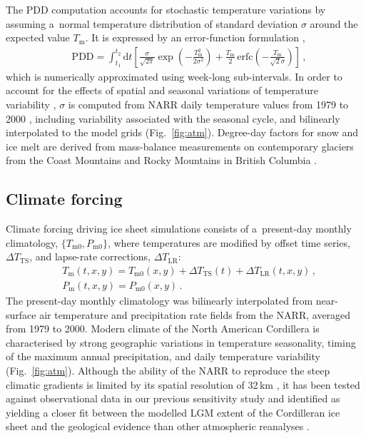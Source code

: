 \documentclass{article}
\newcommand{\unit}[1]{\ensuremath{\mathrm{#1}}}
\begin{document}
      The PDD computation accounts for stochastic temperature variations by
      assuming a~normal temperature distribution of standard deviation
      $\sigma$ around the expected value $T_{\mathrm{m}}$. It is expressed
      by an error-function formulation \citep{Calov.Greve.2005},
\begin{align}
&\label{eqn:calovgreve}
    {\text{PDD}} = \int_{t_1}^{t_2} \mathrm{d}t
        \left[\frac{\sigma}{\sqrt{2\pi}}
                \exp\left({-\frac{T_{\mathrm{m}}^2}{2\sigma^2}}\right)
              + \frac{T_{\mathrm{m}}}{2} \, {\text{erfc}}
                \left(-\frac{T_{\mathrm{m}}}{\sqrt{2}\sigma}\right)\right] \,,
\end{align}
      which is numerically approximated using week-long sub-intervals. In
      order to account for the effects of spatial and seasonal variations of
      temperature variability \citep{Seguinot.2013}, $\sigma$ is computed
      from NARR daily temperature values from 1979 to 2000
      \citep{Mesinger.etal.2006}, including variability associated with the
      seasonal cycle, and bilinearly interpolated to the model grids
      (Fig.~\ref{fig:atm}). Degree-day factors for snow and
      ice melt are derived from mass-balance measurements on contemporary
      glaciers from the Coast Mountains and Rocky Mountains in British
      Columbia \citep[Table~\ref{tab:params};][]{Shea.etal.2009}.

\subsection{Climate forcing}
\label{sec:atm}%

      Climate forcing driving ice sheet simulations consists of
      a~present-day monthly climatology, $\{T_{\mathrm{m}0},
      P_{\mathrm{m}0}\}$, where temperatures are modified by offset time
      series, ${\Delta}T_{\text{TS}}$, and lapse-rate corrections,
      ${\Delta}T_{\text{LR}}$:
\begin{align}
&T_{\mathrm{m}}(t, x, y) = T_{\mathrm{m}0}(x, y) + {\Delta}T_{\text{TS}}(t)
                    + {\Delta}T_{\text{LR}}(t, x, y) \,, \\
&    P_{\mathrm{m}}(t, x, y) = P_{\mathrm{m}0}(x, y) \,.
\end{align}
      The present-day monthly climatology was bilinearly interpolated from
      near-surface air
      temperature and precipitation rate fields from the NARR, averaged from
      1979 to 2000. Modern climate of the North American Cordillera is
      characterised by strong geographic variations in temperature
      seasonality, timing of the maximum annual precipitation, and daily
      temperature variability (Fig.~\ref{fig:atm}). Although the ability
      of the NARR to reproduce the steep climatic gradients is limited by its
      spatial resolution of 32\,\unit{km} \citep{Jarosch.etal.2012}, it has
      been tested against observational data in our previous sensitivity
      study and identified as yielding a closer fit between the modelled LGM
      extent of the Cordilleran ice sheet and the geological evidence than
      other atmospheric reanalyses \citep{Seguinot.etal.2014}.
\end{document}
